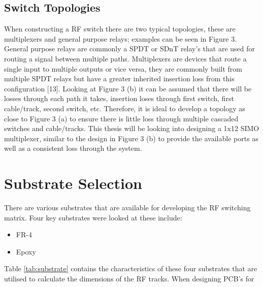 \documentclass[12pt,openany,a4paper]{book}
\begin{document}
\subsection{Switch Topologies}
When constructing a RF switch there are two typical topologies, these are multiplexers and general purpose relays; examples can be seen in Figure 3. General purpose relays are commonly a SPDT or SDnT relay's that are used for routing a signal between multiple paths. Multiplexers are devices that route a single input to multiple outputs or vice versa, they are commonly built from multiple SPDT relays but have a greater inherited insertion loss from this configuration [13]. 
Looking at Figure 3 (b) it can be assumed that there will be losses through each path it takes, insertion loses through first switch, first cable/track, second switch, etc. Therefore, it is ideal to develop a topology as close to Figure 3 (a) to ensure there is little loss through multiple cascaded switches and cable/tracks. This thesis will be looking into designing a 1x12 SIMO multiplexer, similar to the design in Figure 3 (b) to provide the available ports as well as a consistent loss through the system.




\section{Substrate Selection}
There are various substrates that are available for developing the RF switching matrix. Four key substrates were looked at these include:
\begin{itemize} [noitemsep,topsep=0pt]
  \item FR-4
  \item Epoxy
\end{itemize}
Table \ref{tab:substrate} contains the characteristics of these four substrates that are utilised to calculate the dimensions of the RF tracks. 
When designing PCB's for 



\end{document}
